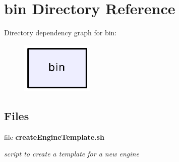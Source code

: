 \section{bin Directory Reference}
\label{dir_2ea30aa2956a8db99dd22aa5e597f384}
Directory dependency graph for bin\-:
\nopagebreak
\begin{figure}[H]
\begin{center}
\leavevmode
\includegraphics[width=98pt]{dir_2ea30aa2956a8db99dd22aa5e597f384_dep}
\end{center}
\end{figure}
\subsection*{Files}
\begin{DoxyCompactItemize}
\item 
file {\bf create\-Engine\-Template.\-sh}
\begin{DoxyCompactList}\small\item\em script to create a template for a new engine \end{DoxyCompactList}\end{DoxyCompactItemize}
